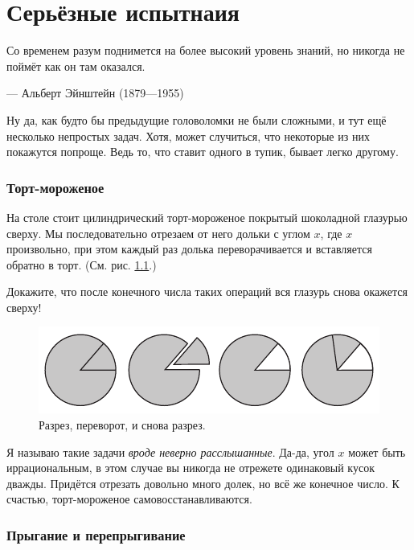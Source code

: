 \chapter{Серьёзные испытнаия}


\setlength{\epigraphwidth}{.80\textwidth}
\epigraph{Со временем разум поднимется на более высокий уровень знаний, но никогда не поймёт как он там оказался.
}{--- Альберт Эйнштейн (1879---1955)}

Ну да, как будто бы предыдущие головоломки не были сложными, и тут ещё несколько непростых задач.
Хотя, может случиться, что некоторые из них покажутся попроще.
Ведь то, что ставит одного в тупик, бывает легко другому.


\subsection*{Торт-мороженое}\label{Торт-мороженое}

На столе стоит цилиндрический торт-мороженое покрытый шоколадной глазурью сверху.
Мы последовательно отрезаем от него дольки с углом $x$, где $x$ произвольно, при этом
каждый раз долька переворачивается и вставляется обратно в торт.
(См. рис. \ref{pic:tort}.)

Докажите, что после конечного числа таких операций вся глазурь снова окажется сверху!


\begin{figure}[htb!]
\centering
\includegraphics[scale=1]{pics/tort}
\caption{Разрез, переворот, и снова разрез.}
\label{pic:tort}
\end{figure}

Я называю такие задачи \emph{вроде неверно расслышанные}.
Да-да, угол $x$ может быть иррациональным, в этом случае вы никогда не отрежете одинаковый кусок дважды.
Придётся отрезать довольно много долек, но всё же конечное число.
К счастью, торт-мороженое самовосстанавливаются.

\subsection*{Прыгание и перепрыгивание}

